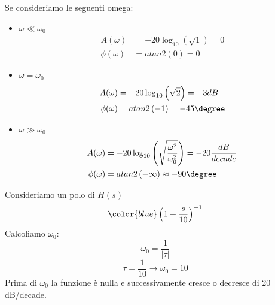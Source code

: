 \documentclass[a4paper]{article}
\begin{document}
\vspace{1em}
\noindent
Se consideriamo le seguenti omega:
\begin{itemize}
  \item \( \omega \ll \omega_0 \)
    \[
      \begin{aligned}
        A(\omega) &= -20 \log_{10} \left( \sqrt{1} \right) = 0\\
        \phi(\omega) &= atan2\left( 0 \right) = 0
      \end{aligned}
    \] 
    \item \( \omega = \omega_0 \) 
      \[
        \begin{aligned}
          A(\omega) &= -20 \log_{10} \left( \sqrt{2} \right) = -3dB\\
          \phi(\omega) &= atan2\left( -1 \right) = -45\degree
        \end{aligned}
      \] 

    \item \( \omega \gg \omega_0 \) 
      \[
        \begin{aligned}
          A(\omega) &= -20 \log_{10} \left( \sqrt{\frac{\omega^2}{\omega_0^2}} \right) =
          -20 \frac{dB}{decade}\\
          \phi(\omega) &= atan2\left( -\infty \right) \approx -90\degree
        \end{aligned}
      \]
\end{itemize}
Consideriamo un polo di \( H(s) \) 
\[
  \color{blue} \left( 1 + \frac{s}{10} \right)^{-1}
\] 
Calcoliamo \( \omega_0 \):
\[
  \omega_0 = \frac{1}{|\tau|}
\] 
\[
  \tau = \frac{1}{10} \to \omega_0 = 10
\] 
Prima di \( \omega_0 \) la funzione è nulla e successivamente cresce o decresce di
20 dB/decade.
\end{document}

